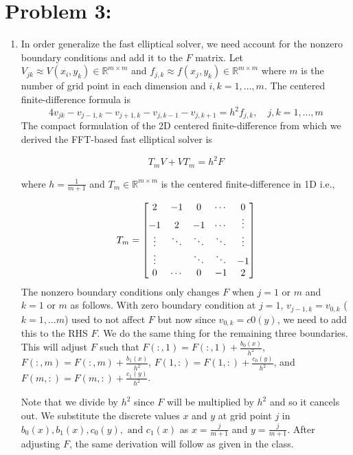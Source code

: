 \newpage
\section*{Problem 3:}
\begin{enumerate}
\item In order generalize the fast elliptical solver, we need account for the nonzero boundary conditions and add it to the $F$ matrix. Let $V_{jk} \approx V(x_{i}, y_{k}) \in \mathbb{R}^{m\times m}$ and $f_{j,k} \approx f(x_{j}, y_{k}) \in \mathbb{R}^{m\times m}$ where $m$ is the number of grid point in each dimension and $i,k = 1, \dots, m$. The centered finite-difference formula is 
$$
4 v_{jk} - v_{j-1,k} - v_{j+1,k} - v_{j, k-1} - v_{j,k+1} = h^{2}f_{j,k}, \quad j,k=1, \dots, m
$$
The compact formulation of the 2D centered finite-difference from which we derived the FFT-based fast elliptical solver is 

$$
T_{m}V + VT_{m} = h^{2}F
$$

where $h=\frac{1}{m+1}$ and $T_{m}\in \mathbb{R}^{m\times m}$ is the centered finite-difference in 1D i.e., 

$$
T_{m} = 
\setcounter{MaxMatrixCols}{11}
\begin{bmatrix}
2 & -1& 0 & \cdots & 0\\
-1& 2 & -1& \cdots  & \vdots\\
\vdots & \ddots & \ddots & \ddots & \vdots\\
\vdots &   & \ddots & \ddots & -1\\
0 & \cdots & 0 & -1 & 2\\
\end{bmatrix}
$$
The nonzero boundary conditions only changes $F$  when $j=1 \text{\ or\ } m$ and $k=1 \text{\ or\ } m$ as follows. With zero boundary condition at $j=1$, $v_{j-1,k} = v_{0,k}$ ($k=1, \dots m $) used to not affect $F$ but now since $v_{0,k} = c0(y)$, we need to add this to the RHS $F$. We do the same thing for the remaining three boundaries. This will adjust $F$ such that $F(:,1) = F(:,1) + \frac{b_{0}(x)}{h^{2}}$, $F(:,m) = F(:,m) + \frac{b_{1}(x)}{h^{2}}$, $F(1,:) = F(1,:) + \frac{c_{0}(y)}{h^{2}}$, and $F(m,:) = F(m,:) + \frac{c_{1}(y)}{h^{2}}$.

Note that we divide by $h^{2}$ since $F$ will be multiplied by $h^{2}$ and so it cancels out. We substitute the discrete values $x$ and $y$ at grid point $j$ in $b_{0}(x), b_{1}(x), c_{0}(y),\text{\ and \ } c_{1}(x)$ as $x= \frac{j}{m+1}$ and $y= \frac{j}{m+1}$. After adjusting $F$, the same derivation will follow as given in the class. 
\end{enumerate}